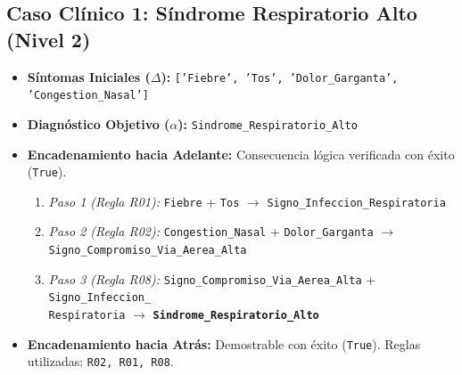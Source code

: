 \documentclass[11pt,a4paper]{article}
\begin{document}
\subsection{Caso Clínico 1: Síndrome Respiratorio Alto (Nivel 2)}
\begin{itemize}
    \item \textbf{Síntomas Iniciales ($\Delta$):} \texttt{['Fiebre', 'Tos', 'Dolor\_Garganta', 'Congestion\_Nasal']}
    \item \textbf{Diagnóstico Objetivo ($\alpha$):} \texttt{Sindrome\_Respiratorio\_Alto}
    \item \textbf{Encadenamiento hacia Adelante:} Consecuencia lógica verificada con éxito (\texttt{True}).
    \begin{enumerate}
        \item \textit{Paso 1 (Regla R01):} \texttt{Fiebre} + \texttt{Tos} $\rightarrow$ \texttt{Signo\_Infeccion\_Respiratoria}
        \item \textit{Paso 2 (Regla R02):} \texttt{Congestion\_Nasal} + \texttt{Dolor\_Garganta} $\rightarrow$ \\ \texttt{Signo\_Compromiso\_Via\_Aerea\_Alta}
        \item \textit{Paso 3 (Regla R08):} \texttt{Signo\_Compromiso\_Via\_Aerea\_Alta} + \texttt{Signo\_Infeccion\_\\  Respiratoria} $\rightarrow$ \textbf{\texttt{Sindrome\_Respiratorio\_Alto}}
    \end{enumerate}
    \item \textbf{Encadenamiento hacia Atrás:} Demostrable con éxito (\texttt{True}). Reglas utilizadas: \texttt{R02, R01, R08}.
\end{itemize}
\end{document}
